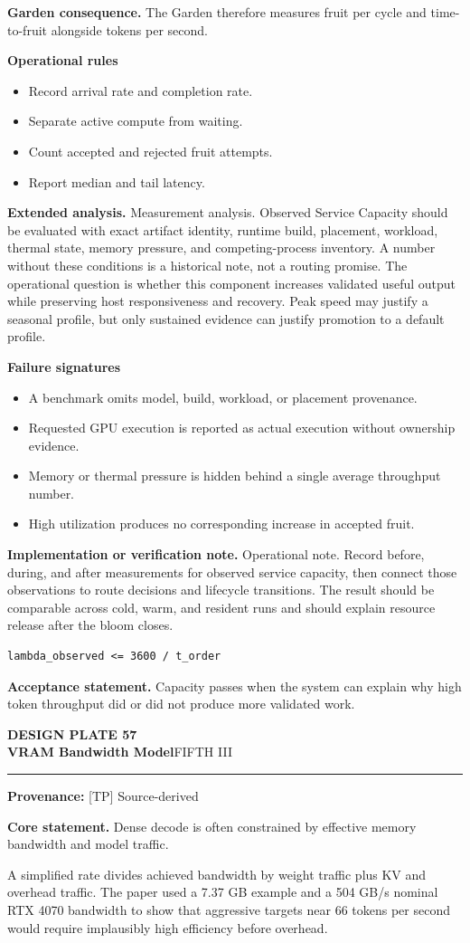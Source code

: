 \documentclass[10pt,letterpaper,oneside]{article}
\newcommand{\prov}[1]{\textcolor{gardenBlue}{\sffamily\footnotesize\textbf{Provenance:} #1}}
\newcommand{\platetitle}[3]{%
  \begin{minipage}[t][0.54in][t]{\textwidth}
  {\sffamily\bfseries\color{gardenDeep}\fontsize{9}{10}\selectfont DESIGN PLATE #1}\\[-1pt]
  {\sffamily\bfseries\color{gardenInk}\fontsize{16.5}{18}\selectfont #2}\hfill{\sffamily\color{gardenGreen}\large #3}
  \end{minipage}\vspace{-2pt}\hrule\vspace{5pt}}
\begin{document}
\textbf{Garden consequence.} The Garden therefore measures fruit per cycle and time-to-fruit alongside tokens per second.

\textbf{Operational rules}
\begin{itemize}
\item Record arrival rate and completion rate.
\item Separate active compute from waiting.
\item Count accepted and rejected fruit attempts.
\item Report median and tail latency.
\end{itemize}
\textbf{Extended analysis.} Measurement analysis. Observed Service Capacity should be evaluated with exact artifact identity, runtime build, placement, workload, thermal state, memory pressure, and competing-process inventory. A number without these conditions is a historical note, not a routing promise. The operational question is whether this component increases validated useful output while preserving host responsiveness and recovery. Peak speed may justify a seasonal profile, but only sustained evidence can justify promotion to a default profile.

\textbf{Failure signatures}
\begin{itemize}
\item A benchmark omits model, build, workload, or placement provenance.
\item Requested GPU execution is reported as actual execution without ownership evidence.
\item Memory or thermal pressure is hidden behind a single average throughput number.
\item High utilization produces no corresponding increase in accepted fruit.
\end{itemize}
\textbf{Implementation or verification note.} Operational note. Record before, during, and after measurements for observed service capacity, then connect those observations to route decisions and lifecycle transitions. The result should be comparable across cold, warm, and resident runs and should explain resource release after the bloom closes.

\begin{lstlisting}
lambda_observed <= 3600 / t_order
\end{lstlisting}
\begin{acceptbox}
\textbf{Acceptance statement.} Capacity passes when the system can explain why high token throughput did or did not produce more validated work.
\end{acceptbox}
\newpage
\platetitle{57}{VRAM Bandwidth Model}{FIFTH III}
\prov{[TP] Source-derived}
\fontsize{8.85}{10.45}\selectfont
\begin{corebox}
\textbf{Core statement.} Dense decode is often constrained by effective memory bandwidth and model traffic.
\end{corebox}
A simplified rate divides achieved bandwidth by weight traffic plus KV and overhead traffic. The paper used a 7.37 GB example and a 504 GB/s nominal RTX 4070 bandwidth to show that aggressive targets near 66 tokens per second would require implausibly high efficiency before overhead.
\end{document}
